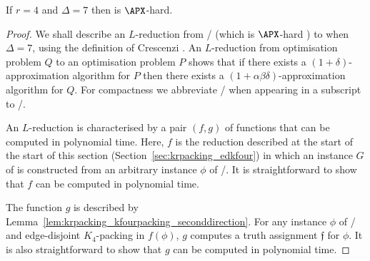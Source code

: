 \begin{lem}
\label{lem:krpacking_edkr_req4_apxhard}
If $r=4$ and $\Delta=7$ then \edkr is $\APX$-hard.
\end{lem}
\begin{proof}
We shall describe an $L$-reduction from \maxtwosatthree/ (which is $\APX$-hard \cite{ACGKMP99}) to \edkfour when $\Delta = 7$, using the definition of Crescenzi \cite{Crescenzi97}. An $L$-reduction from optimisation problem $Q$ to an optimisation problem $P$ shows that if there exists a $(1+\delta)$-approximation algorithm for $P$ then there exists a $(1 + \alpha\beta\delta)$-approximation algorithm for $Q$. For compactness we abbreviate \maxtwosatthree/ when appearing in a subscript to \maxtwosatthreeshort/.

An $L$-reduction is characterised by a pair $(f, g)$ of functions that can be computed in polynomial time. Here, $f$ is the reduction described at the start of the start of this section (Section~\ref{sec:krpacking_edkfour}) in which an instance $G$ of \edkfour is constructed from an arbitrary instance $\phi$ of \maxtwosatthree/. It is straightforward to show that $f$ can be computed in polynomial time.

The function $g$ is described by Lemma~\ref{lem:krpacking_kfourpacking_seconddirection}. For any instance $\phi$ of \maxtwosatthree/ and edge-disjoint $K_4$-packing in $f(\phi)$, $g$ computes a truth assignment $\mathfrak{f}$ for $\phi$. It is also straightforward to show that $g$ can be computed in polynomial time.


\end{proof}
